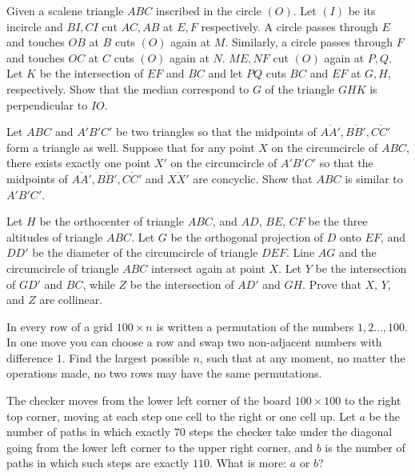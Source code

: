 \documentclass[11pt]{scrartcl}
\begin{document}
\begin{problem}[86986480818494]
Given a scalene triangle $ABC$ inscribed in the circle $(O)$. Let $(I)$ be its incircle and $BI,CI$ cut $AC,AB$ at $E,F$ respectively. A circle passes through $E$ and touches $OB$ at $B$ cuts $(O)$ again at $M$. Similarly, a circle passes through $F$ and touches $OC$ at $C$ cuts $(O)$ again at $N$. $ME,NF$ cut $(O)$ again at $P,Q$. Let $K$ be the intersection of $EF$ and $BC$ and let $PQ$ cuts $BC$ and $EF$ at $G,H$, respectively. Show that the median correspond to $G$ of the triangle $GHK$ is perpendicular to $IO$.
\end{problem}
\begin{problem}[915997916422887]
	Let $ABC$ and $A'B'C'$ be two triangles so that the midpoints of $\overline{AA'}, \overline{BB'}, \overline{CC'}$ form a triangle as well. Suppose that for any point $X$ on the circumcircle of $ABC$, there exists exactly one point $X'$ on the circumcircle of $A'B'C'$ so that the midpoints of $\overline{AA'}, \overline{BB'}, \overline{CC'}$ and $\overline{XX'}$ are concyclic. Show that $ABC$ is similar to $A'B'C'$.
\end{problem}
\begin{problem}[1872712387771032593]
Let $H$ be the orthocenter of triangle $ABC$, and $AD$, $BE$, $CF$ be the three altitudes of triangle $ABC$. Let $G$ be the orthogonal projection of $D$ onto $EF$, and $DD'$ be the diameter of the circumcircle of triangle $DEF$. Line $AG$ and the circumcircle of triangle $ABC$ intersect again at point $X$. Let $Y$ be the intersection of $GD'$ and $BC$, while $Z$ be the intersection of $AD'$ and $GH$. Prove that $X$, $Y$, and $Z$ are collinear.
\end{problem}
\begin{problem}[5664985199661230516]
In every row of a grid $100 \times n$ is written a permutation of the numbers $1,2 \ldots, 100$. In one move you can choose a row and swap two non-adjacent numbers with difference $1$. Find the largest possible $n$, such that at any moment, no matter the operations made, no two rows may have the same permutations.
\end{problem}
\begin{problem}[677860185151955]
	The checker moves from the lower left corner of the board $100 \times 100$ to the right top corner, moving at each step one cell to the right or one cell up. Let $a$ be the number of paths in which exactly $70$ steps the checker take under the diagonal going from the lower left corner to the upper right corner, and $b$ is the number of paths in which such steps are exactly $110$. What is more: $a$ or $b$?
\end{problem}
\end{document}

